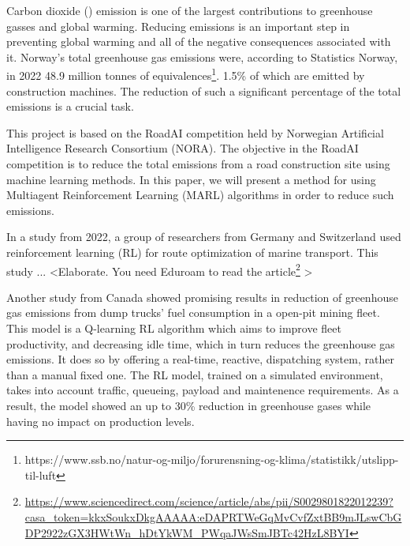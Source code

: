 \documentclass[conference]{IEEEtran}
\begin{document}
	Carbon dioxide (\coo{}) emission is one of the largest contributions to greenhouse gasses and global warming.
	Reducing \coo{} emissions is an important step in preventing global warming and all of the negative
	consequences associated with it. Norway's total greenhouse gas emissions were, according to Statistics
	Norway, in 2022 48.9 million tonnes of \coo{}
	equivalences\footnote{https://www.ssb.no/natur-og-miljo/forurensning-og-klima/statistikk/utslipp-til-luft}.
	1.5\% of which are emitted by construction machines. \cite{noraRoadAIReducing} The reduction of such
	a significant percentage of the total emissions is a crucial task.

	This project is based on the RoadAI competition held by Norwegian Artificial Intelligence Research
	Consortium (NORA). \cite{noraRoadAIReducing} The objective in the RoadAI competition is to reduce the
	total \coo{} emissions from a road construction site using machine learning methods. In this paper, we will
	present a method for using Multiagent Reinforcement Learning (MARL) algorithms in order to reduce such
	emissions.

	In a study from 2022, a group of researchers from Germany and Switzerland used reinforcement learning
	(RL) for route optimization of marine transport. \cite{MORADI2022111882} This study ... \textless Elaborate. You need
	Eduroam to read the article\footnote{\url{https://www.sciencedirect.com/science/article/abs/pii/S0029801822012239?casa_token=kkxSoukxDkgAAAAA:eDAPRTWeGqMvCvfZxtBB9mJLswCbGDP2922zGX3HWtWn_hDtYkWM_PWqaJWsSmJBTc42HzL8BYI}} \textgreater %

	Another study from Canada \cite{HUO2023106664} showed promising results in reduction of greenhouse gas
	emissions
	from dump trucks' fuel consumption in a open-pit mining fleet. This model is a Q-learning RL algorithm
	which aims to improve fleet productivity, and decreasing idle time, which in turn reduces the greenhouse
	gas emissions. It does so by offering a real-time, reactive,  dispatching system, rather than a manual
	fixed one. The RL model, trained on a simulated environment, takes into account traffic, queueing,
	payload and maintenence requirements. As a result, the model showed an up to 30\% reduction in greenhouse
	gases while having no impact on production levels.

\end{document}
